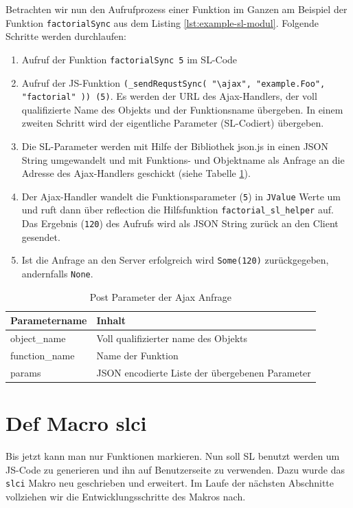 \documentclass[12pt]{scrreprt}
\begin{document}
Betrachten wir nun den Aufrufprozess einer Funktion im Ganzen am Beispiel der Funktion \lstinline!factorialSync! aus dem Listing \ref{lst:example-sl-modul}. Folgende Schritte werden durchlaufen:
\begin{enumerate}
 \item{Aufruf der Funktion \lstinline!factorialSync 5! im \ac{SL}-Code}
 \item{Aufruf der \ac{JS}-Funktion \lstinline!(_sendRequstSync( "\ajax", "example.Foo", "factorial" )) (5)!. Es werden der \ac{URL} des Ajax-Handlers, der voll qualifizierte Name des Objekts und der Funktionsname übergeben. In einem zweiten Schritt wird der eigentliche Parameter (\ac{SL}-Codiert) übergeben.}
 \item{Die \ac{SL}-Parameter werden mit Hilfe der Bibliothek json.js \cite{Crockford2010} in einen JSON String umgewandelt und mit Funktions- und Objektname als Anfrage an die Adresse des Ajax-Handlers geschickt (siehe Tabelle \ref{tab:post-parameter}).}
 \item{Der Ajax-Handler wandelt die Funktionsparameter (\lstinline!5!) in \lstinline!JValue! Werte um \cite{Json4s} und ruft dann über reflection die Hilfsfunktion \lstinline!factorial_sl_helper! auf. Das Ergebnis (\lstinline!120!) des Aufrufs wird als JSON String zurück an den Client gesendet.}
 \item{Ist die Anfrage an den Server erfolgreich wird \lstinline!Some(120)! zurückgegeben, andernfalls \lstinline!None!.}
\end{enumerate}

\begin{table}[h]
\caption{Post Parameter der Ajax Anfrage}
\centering
\begin{tabular}{ll}
Parametername        &   Inhalt \\
\hline
object\_name   & Voll qualifizierter name des Objekts \\
function\_name & Name der Funktion\\
params         & JSON encodierte Liste der übergebenen Parameter\\
\end{tabular}
\label{tab:post-parameter}
\end{table}

\section{Def Macro slci}
\label{sec:inline-macro}

Bis jetzt kann man nur Funktionen markieren. Nun soll \ac{SL} benutzt werden um \ac{JS}-Code zu generieren und ihn auf Benutzerseite zu verwenden. Dazu wurde das \lstinline!slci! Makro neu geschrieben und erweitert. Im Laufe der nächsten Abschnitte vollziehen wir die Entwicklungsschritte des Makros nach.
\end{document}
